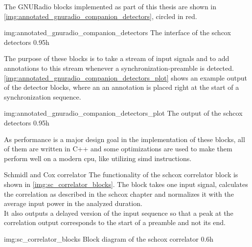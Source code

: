 The GNURadio blocks implemented as part of this thesis are
shown in \autoref{img:annotated_gnuradio_companion_detectors},
circled in red.

             {img:annotated_gnuradio_companion_detectors}
             {The interface of the \gls{schcox} detectors}
             {0.95}{h}

The purpose of these blocks is to take a stream of input signals
and to add annotations to this stream whenever a synchronization-preamble
is detected.
\autoref{img:annotated_gnuradio_companion_detectors_plot} shows an example output
of the detector blocks, where an an annotation is placed right at the start of a
synchronization sequence.

             {img:annotated_gnuradio_companion_detectors_plot}
             {The output of the \gls{schcox} detectors}
             {0.95}{h}

As performance is a major design goal in the implementation of these blocks,
all of them are written in C++ and some optimizations are used to make them
perform well on a modern \acrshort{cpu}, like utilizing
\acrshort{simd} instructions.

\begin{subchapter}{Schmidl and Cox correlator}
  The functionality of the \acrlong{schcox} correlator
  block is shown in \autoref{img:sc_correlator_blocks}.
  The block takes one input signal, calculates the correlation
  as described in the \acrlong{schcox} chapter and normalizes it
  with the average input power in the analyzed duration. \\

  It also outputs a delayed version of the input sequence so that
  a peak at the correlation output corresponds to the start of a
  preamble and not its end.

               {img:sc_correlator_blocks}
               {Block diagram of the \acrlong{schcox} correlator}
               {0.6}{h}
\end{subchapter}


